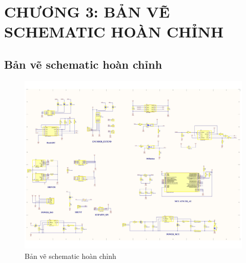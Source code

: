 \documentclass{article}
\begin{document}
\cleardoublepage

\section*{CHƯƠNG 3: BẢN VẼ SCHEMATIC HOÀN CHỈNH}
\subsection{Bản vẽ schematic hoàn chỉnh}
\begin{figure}[H]
    \centering
    \includegraphics[width=1\textwidth]{image/ISO_current.png}
    \caption{Bản vẽ schematic hoàn chỉnh}
    \label{fig:schematic}
\end{figure}
\cleardoublepage
\end{document}
